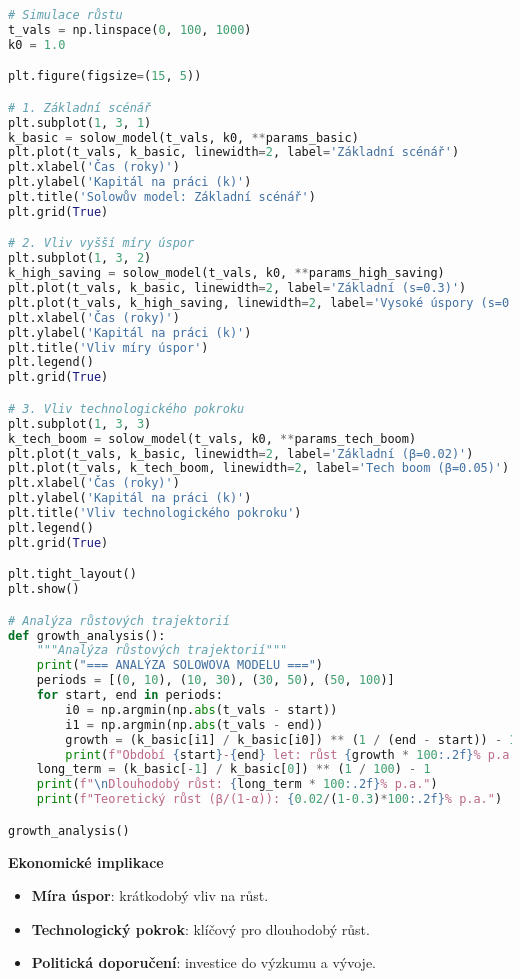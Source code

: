 \begin{example}
\begin{lstlisting}[language=Python, caption={Implementace Solowova modelu v~Pythonu}]
# Simulace růstu
t_vals = np.linspace(0, 100, 1000)
k0 = 1.0

plt.figure(figsize=(15, 5))

# 1. Základní scénář
plt.subplot(1, 3, 1)
k_basic = solow_model(t_vals, k0, **params_basic)
plt.plot(t_vals, k_basic, linewidth=2, label='Základní scénář')
plt.xlabel('Čas (roky)')
plt.ylabel('Kapitál na práci (k)')
plt.title('Solowův model: Základní scénář')
plt.grid(True)

# 2. Vliv vyšší míry úspor
plt.subplot(1, 3, 2)
k_high_saving = solow_model(t_vals, k0, **params_high_saving)
plt.plot(t_vals, k_basic, linewidth=2, label='Základní (s=0.3)')
plt.plot(t_vals, k_high_saving, linewidth=2, label='Vysoké úspory (s=0.4)')
plt.xlabel('Čas (roky)')
plt.ylabel('Kapitál na práci (k)')
plt.title('Vliv míry úspor')
plt.legend()
plt.grid(True)

# 3. Vliv technologického pokroku
plt.subplot(1, 3, 3)
k_tech_boom = solow_model(t_vals, k0, **params_tech_boom)
plt.plot(t_vals, k_basic, linewidth=2, label='Základní (β=0.02)')
plt.plot(t_vals, k_tech_boom, linewidth=2, label='Tech boom (β=0.05)')
plt.xlabel('Čas (roky)')
plt.ylabel('Kapitál na práci (k)')
plt.title('Vliv technologického pokroku')
plt.legend()
plt.grid(True)

plt.tight_layout()
plt.show()

# Analýza růstových trajektorií
def growth_analysis():
    """Analýza růstových trajektorií"""
    print("=== ANALÝZA SOLOWOVA MODELU ===")
    periods = [(0, 10), (10, 30), (30, 50), (50, 100)]
    for start, end in periods:
        i0 = np.argmin(np.abs(t_vals - start))
        i1 = np.argmin(np.abs(t_vals - end))
        growth = (k_basic[i1] / k_basic[i0]) ** (1 / (end - start)) - 1
        print(f"Období {start}-{end} let: růst {growth * 100:.2f}% p.a.")
    long_term = (k_basic[-1] / k_basic[0]) ** (1 / 100) - 1
    print(f"\nDlouhodobý růst: {long_term * 100:.2f}% p.a.")
    print(f"Teoretický růst (β/(1-α)): {0.02/(1-0.3)*100:.2f}% p.a.")

growth_analysis()
\end{lstlisting}

\noindent\textbf{Ekonomické implikace}
\begin{itemize}
\item \textbf{Míra úspor}: krátkodobý vliv na růst.
\item \textbf{Technologický pokrok}: klíčový pro dlouhodobý růst.
\item \textbf{Politická doporučení}: investice do výzkumu a vývoje.
\end{itemize}


\end{example}

